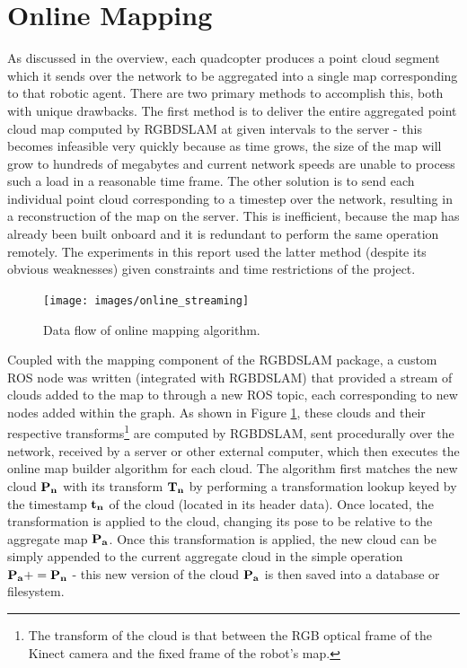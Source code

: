 \documentclass[letterpaper, oneside, 10pt]{report}
\begin{document}
\section{Online Mapping}
As discussed in the overview, each quadcopter produces a point cloud segment which it sends over the network to be aggregated into a single map corresponding to that robotic agent. There are two primary methods to accomplish this, both with unique drawbacks. The first method is to deliver the entire aggregated point cloud map computed by RGBDSLAM at given intervals to the server - this becomes infeasible very quickly because as time grows, the size of the map will grow to hundreds of megabytes and current network speeds are unable to process such a load in a reasonable time frame. The other solution is to send each individual point cloud corresponding to a timestep over the network, resulting in a reconstruction of the map on the server. This is inefficient, because the map has already been built onboard and it is redundant to perform the same operation remotely. The experiments in this report used the latter method (despite its obvious weaknesses) given constraints and time restrictions of the project.

\begin{figure}[h!]
 \caption{Data flow of online mapping algorithm.}
 \centering
   \texttt{[image: images/online\_streaming]}
 \label{fig: online stream.}
\end{figure}

Coupled with the mapping component of the RGBDSLAM package, a custom ROS node was written (integrated with RGBDSLAM) that provided a stream of clouds added to the map to through a new ROS topic, each corresponding to new nodes added within the graph. As shown in Figure \ref{fig: online stream.}, these clouds and their respective transforms\footnote{The transform of the cloud is that between the RGB optical frame of the Kinect camera and the fixed frame of the robot's map.} are computed by RGBDSLAM, sent procedurally over the network, received by a server or other external computer, which then executes the online map builder algorithm for each cloud. The algorithm first matches the new cloud $\bf{P_n}$ with its transform $\bf{T_n}$ by performing a transformation lookup keyed by the timestamp $\bf{t_n}$ of the cloud (located in its header data). Once located, the transformation is applied to the cloud, changing its pose to be relative to the aggregate map $\bf{P_a}$. Once this transformation is applied, the new cloud can be simply appended to the current aggregate cloud in the simple operation $\bf{P_a} += \bf{P_n}$  - this new version of the cloud $\bf{P_a}$ is then saved into a database or filesystem.
\end{document}
